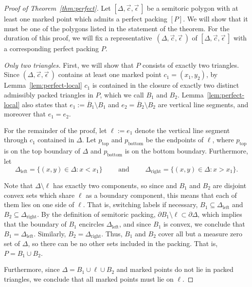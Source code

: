 \documentclass[10pt,a4paper]{amsart}
\numberwithin{equation}{section}
\newcommand{\De}{\Delta}
\newcommand{\stpoly}{[\De,\vec{c},\vec{\epsilon}\,]}
\newcommand{\strep}{(\De,\vec{c},\vec{\epsilon}\,)}
\theoremstyle{definition}
\theoremstyle{plain}
\theoremstyle{plain}
\begin{document}
\begin{proof}[Proof of Theorem~\ref{thm:perfect}]
Let $\stpoly$ be a semitoric polygon with at least one marked point which admits a perfect packing $[P]$.
We will show that it must be one of the polygons listed in the statement of the theorem.
For the duration of this proof, we will fix a representative~$\strep$ of $\stpoly$ with a corresponding perfect packing $P$.

{\it Only two triangles.}
First, we will show that $P$ consists of exactly two triangles.
Since $\strep$ contains at least one marked point $c_1 = (x_1,y_2)$, by Lemma~\ref{lem:perfect-local} $c_1$ is contained in the closure of exactly two distinct admissibly packed triangles in $P$, which we call $B_1$ and $B_2$.
Lemma~\ref{lem:perfect-local} also states that $e_1:=\overline{B}_1\setminus B_1$ and $e_2 = \overline{B}_2\setminus B_2$ are vertical line segments, and moreover that $e_1=e_2$.

For the remainder of the proof, let $\ell :=e_1$ denote the vertical line segment through $c_1$ contained in $\De$.
Let $p_{\text{top}}$ and $p_{\text{bottom}}$ be the endpoints of $\ell$, where $p_{\text{top}}$ is on the top boundary of $\De$ and $p_{\text{bottom}}$ is on the bottom boundary.
Furthermore, let
\[
\De_{\text{left}} = \{(x,y)\in\De\colon x<x_1\} \qquad \text{ and } \qquad
\De_{\text{right}} = \{(x,y)\in\De\colon x>x_1\}.
\]

Note that $\De\setminus\ell$ has exactly two components, so since and $B_1$ and $B_2$ are disjoint convex sets which share $\ell$ as a boundary component, this means that each of them lies on one side of $\ell$. That is, switching labels if necessary, $B_1\subseteq \De_{\text{left}}$ and $B_2\subseteq \De_{\text{right}}$.
By the definition of semitoric packing, $\partial B_1 \setminus \ell \subset \partial \De$, which implies that the boundary of $B_1$ encircles $\De_{\text{left}}$, and since $B_1$ is convex, we conclude that $B_1 = \De_{\text{left}}$. Similarly, $B_2 = \De_{\text{right}}$.
Thus, $B_1$ and $B_2$ cover all but a measure zero set of $\De$, so there can be no other sets included in the packing. That is, $P = B_1 \cup B_2$.

Furthermore, since $\De = B_1 \cup \ell \cup B_2$ and marked points do not lie in packed triangles, we conclude that all marked points must lie on $\ell$.


\end{proof}
\end{document}
